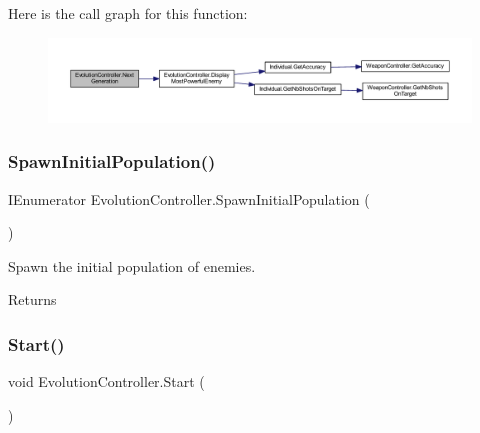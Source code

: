 Here is the call graph for this function\+:\nopagebreak
\begin{figure}[H]
\begin{center}
\leavevmode
\includegraphics[width=350pt]{class_evolution_controller_ac65df1af1e9cdf179606f205e8f046f0_cgraph}
\end{center}
\end{figure}
\mbox{\label{class_evolution_controller_a7882ed1ac17cf9cb79a8559c3fa47676}} 
\subsubsection{\texorpdfstring{Spawn\+Initial\+Population()}{SpawnInitialPopulation()}}
{\footnotesize\ttfamily I\+Enumerator Evolution\+Controller.\+Spawn\+Initial\+Population (\begin{DoxyParamCaption}{ }\end{DoxyParamCaption})}



Spawn the initial population of enemies. 

\begin{DoxyReturn}{Returns}

\end{DoxyReturn}
\mbox{\label{class_evolution_controller_a1f5c6f777133971fb18af4e032c20ab1}} 
\subsubsection{\texorpdfstring{Start()}{Start()}}
{\footnotesize\ttfamily void Evolution\+Controller.\+Start (\begin{DoxyParamCaption}{ }\end{DoxyParamCaption})}



